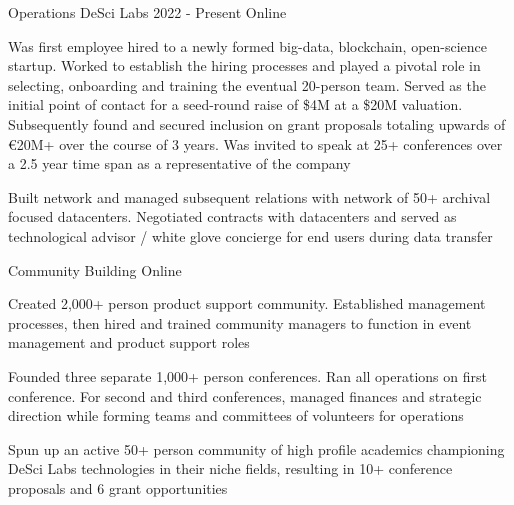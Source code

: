
\begin{cventries}

  \cventry
    {Operations} %
    {DeSci Labs} %
    {2022 - Present} %
    {Online} %
    {
      \begin{cvitems} %
        \item {Was first employee hired to a newly formed big-data, blockchain, open-science startup. Worked to establish the hiring processes and played a pivotal role in selecting, onboarding and training the eventual 20-person team. Served as the initial point of contact for a seed-round raise of \$4M at a \$20M valuation. Subsequently found and secured inclusion on grant proposals totaling upwards of €20M+ over the course of 3 years. Was invited to speak at 25+ conferences over a 2.5 year time span as a representative of the company}
        \item {Built network and managed subsequent relations with network of 50+ archival focused datacenters. Negotiated contracts with datacenters and served as technological advisor / white glove concierge for end users during data transfer}  
      \end{cvitems}
    }
    
  \cventry
    {Community Building} %
    {} %
    {} %
    {Online} %
    {
      \begin{cvitems} %
        \item {Created 2,000+ person product support community. Established management processes, then hired and trained community managers to function in event management and product support roles}
        \item {Founded three separate 1,000+ person conferences. Ran all operations on first conference. For second and third conferences, managed finances and strategic direction while forming teams and committees of volunteers for operations}
        \item {Spun up an active 50+ person community of high profile academics championing DeSci Labs technologies in their niche fields, resulting in 10+ conference proposals and 6 grant opportunities}
      \end{cvitems}
    }


\end{cventries}

